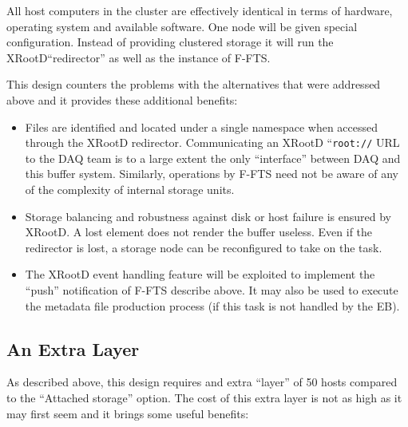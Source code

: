 \documentclass[pdftex,12pt,letter]{article}
\newcommand{\xrd}{XRootD\xspace}
\begin{document}
All host computers in the cluster are effectively identical in terms
of hardware, operating system and available software.  One node will
be given special configuration.  Instead of providing clustered
storage it will run the \xrd ``redirector'' as well as the instance of
F-FTS.

This design counters the problems with the alternatives that were
addressed above and it provides these additional benefits:

\begin{itemize}
\item Files are identified and located under a single namespace when
  accessed through the \xrd redirector.  Communicating an \xrd
  ``\texttt{root://} URL to the DAQ team is to a large extent the only
  ``interface'' between DAQ and this buffer system.  Similarly,
  operations by F-FTS need not be aware of any of the complexity of
  internal storage units.
\item Storage balancing and robustness against disk or host failure is
  ensured by \xrd.  A lost element does not render the buffer useless.
  Even if the redirector is lost, a storage node can be reconfigured
  to take on the task.
\item The \xrd event handling feature will be exploited to implement
  the ``push'' notification of F-FTS describe above.  It may also be
  used to execute the metadata file production process (if this task
  is not handled by the EB).
\end{itemize}

\subsection{An Extra Layer}

As described above, this design requires and extra ``layer'' of 50
hosts compared to the ``Attached storage'' option.  The cost of this
extra layer is not as high as it may first seem and it brings some
useful benefits:
\end{document}
